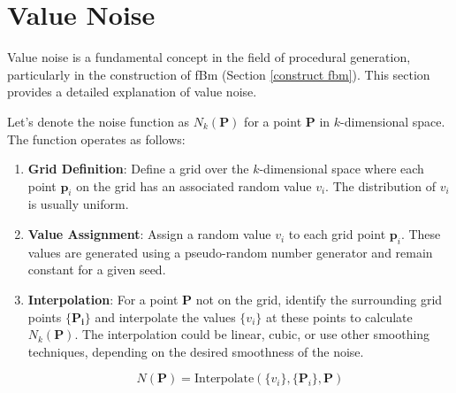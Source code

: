 \label{sec:A}

\section{Value Noise}
\label{value noise}


Value noise is a fundamental concept in the field of procedural generation, particularly in the construction of fBm (Section \ref{construct fbm}). This section provides a detailed explanation of value noise.

Let's denote the noise function as $N_k(\mathbf{P})$ for a point $\mathbf{P}$ in $k$-dimensional space. The function operates as follows:

\begin{enumerate}
    \item \textbf{Grid Definition}: Define a grid over the $k$-dimensional space where each point $\mathbf{p}_i$ on the grid has an associated random value $v_i$. The distribution of $v_i$ is usually uniform.

    \item \textbf{Value Assignment}: Assign a random value $v_i$ to each grid point $\mathbf{p}_i$. These values are generated using a pseudo-random number generator and remain constant for a given seed.

    \item \textbf{Interpolation}: For a point $\mathbf{P}$ not on the grid, identify the surrounding grid points $\{\mathbf{P_{i}\}}$ and interpolate the values $\{v_i\}$ at these points to calculate $N_k(\mathbf{P})$. The interpolation could be linear, cubic, or use other smoothing techniques, depending on the desired smoothness of the noise.
    
    \begin{equation}
        N(\mathbf{P}) = \text{Interpolate}(\{v_i\}, \{\mathbf{P}_i\}, \mathbf{P}) 
    \end{equation}
\end{enumerate}
